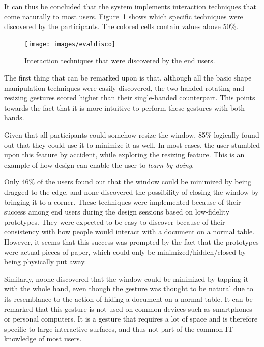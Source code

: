 It can thus be concluded that the system implements interaction techniques that come naturally to most users.
Figure~\ref{fig:evaldisco} shows which specific techniques were discovered by the participants. The colored cells contain values above 50\%.

\begin{figure}[htb]
  \centering
    \texttt{[image: images/evaldisco]}
    \caption{Interaction techniques that were discovered by the end users.}
    \label{fig:evaldisco}
\end{figure}

The first thing that can be remarked upon is that, although all the basic shape manipulation techniques were easily discovered, the two-handed rotating and resizing gestures scored higher than their single-handed counterpart.
This points towards the fact that it is more intuitive to perform these gestures with both hands.

Given that all participants could somehow resize the window, 85\% logically found out that they could use it to minimize it as well.
In most cases, the user stumbled upon this feature by accident, while exploring the resizing feature.
This is an example of how design can enable the user to \emph{learn by doing}.

Only 46\% of the users found out that the window could be minimized by being dragged to the edge, and none discovered the possibility of closing the window by bringing it to a corner.
These techniques were implemented because of their success among end users during the design sessions based on low-fidelity prototypes.
They were expected to be easy to discover because of their consistency with how people would interact with a document on a normal table.
However, it seems that this success was prompted by the fact that  the prototypes were actual pieces of paper, which could only be minimized/hidden/closed by being physically put away.

Similarly, noone discovered that the window could be minimized by tapping it with the whole hand, even though the gesture was thought to be natural due to its resemblance to the action of hiding a document on a normal table.
It can be remarked that this gesture is not used on common devices such as smartphones or personal computers.
It is a gesture that requires a lot of space and is therefore specific to large interactive surfaces, and thus not part of the common IT knowledge of most users.

